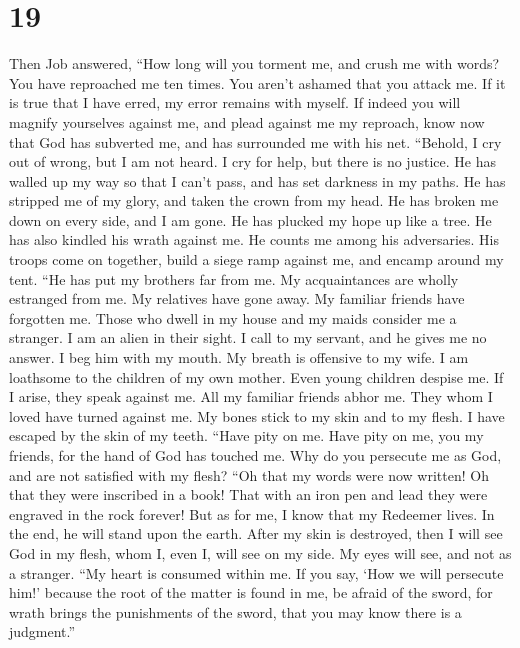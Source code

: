 \hypertarget{section-10}{%
\section{19}\label{section-10}}

 Then Job answered,  ``How long will you torment
me, and crush me with words?  You have reproached me ten
times. You aren't ashamed that you attack me.  If it is true
that I have erred, my error remains with myself.  If indeed
you will magnify yourselves against me, and plead against me my
reproach,  know now that God has subverted me, and has
surrounded me with his net.  ``Behold, I cry out of wrong,
but I am not heard. I cry for help, but there is no justice.
 He has walled up my way so that I can't pass, and has set
darkness in my paths.  He has stripped me of my glory, and
taken the crown from my head.  He has broken me down on
every side, and I am gone. He has plucked my hope up like a tree.
 He has also kindled his wrath against me. He counts me
among his adversaries.  His troops come on together, build
a siege ramp against me, and encamp around my tent.  ``He
has put my brothers far from me. My acquaintances are wholly estranged
from me.  My relatives have gone away. My familiar friends
have forgotten me.  Those who dwell in my house and my
maids consider me a stranger. I am an alien in their sight.
 I call to my servant, and he gives me no answer. I beg him
with my mouth.  My breath is offensive to my wife. I am
loathsome to the children of my own mother.  Even young
children despise me. If I arise, they speak against me. 
All my familiar friends abhor me. They whom I loved have turned against
me.  My bones stick to my skin and to my flesh. I have
escaped by the skin of my teeth.  ``Have pity on me. Have
pity on me, you my friends, for the hand of God has touched me.
 Why do you persecute me as God, and are not satisfied with
my flesh?  ``Oh that my words were now written! Oh that
they were inscribed in a book!  That with an iron pen and
lead they were engraved in the rock forever!  But as for
me, I know that my Redeemer lives. In the end, he will stand upon the
earth.  After my skin is destroyed, then I will see God in
my flesh,  whom I, even I, will see on my side. My eyes
will see, and not as a stranger. ``My heart is consumed within me.
 If you say, `How we will persecute him!' because the root
of the matter is found in me,  be afraid of the sword, for
wrath brings the punishments of the sword, that you may know there is a
judgment.''

